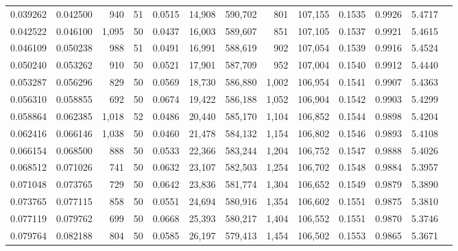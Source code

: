 \begin{tabular}{rrrrrrrrrrrrr}
0.039262 & 0.042500 &   940 &  51 &                                     0.0515 &  14,908 & 590,702 &     801 & 107,155 & 0.1535 & 0.9926 & 5.4717 \\
0.042522 & 0.046100 & 1,095 &  50 &                                     0.0437 &  16,003 & 589,607 &     851 & 107,105 & 0.1537 & 0.9921 & 5.4615 \\
0.046109 & 0.050238 &   988 &  51 &                                     0.0491 &  16,991 & 588,619 &     902 & 107,054 & 0.1539 & 0.9916 & 5.4524 \\
0.050240 & 0.053262 &   910 &  50 &                                     0.0521 &  17,901 & 587,709 &     952 & 107,004 & 0.1540 & 0.9912 & 5.4440 \\
0.053287 & 0.056296 &   829 &  50 &                                     0.0569 &  18,730 & 586,880 &   1,002 & 106,954 & 0.1541 & 0.9907 & 5.4363 \\
0.056310 & 0.058855 &   692 &  50 &                                     0.0674 &  19,422 & 586,188 &   1,052 & 106,904 & 0.1542 & 0.9903 & 5.4299 \\
0.058864 & 0.062385 & 1,018 &  52 &                                     0.0486 &  20,440 & 585,170 &   1,104 & 106,852 & 0.1544 & 0.9898 & 5.4204 \\
0.062416 & 0.066146 & 1,038 &  50 &                                     0.0460 &  21,478 & 584,132 &   1,154 & 106,802 & 0.1546 & 0.9893 & 5.4108 \\
0.066154 & 0.068500 &   888 &  50 &                                     0.0533 &  22,366 & 583,244 &   1,204 & 106,752 & 0.1547 & 0.9888 & 5.4026 \\
0.068512 & 0.071026 &   741 &  50 &                                     0.0632 &  23,107 & 582,503 &   1,254 & 106,702 & 0.1548 & 0.9884 & 5.3957 \\
0.071048 & 0.073765 &   729 &  50 &                                     0.0642 &  23,836 & 581,774 &   1,304 & 106,652 & 0.1549 & 0.9879 & 5.3890 \\
0.073765 & 0.077115 &   858 &  50 &                                     0.0551 &  24,694 & 580,916 &   1,354 & 106,602 & 0.1551 & 0.9875 & 5.3810 \\
0.077119 & 0.079762 &   699 &  50 &                                     0.0668 &  25,393 & 580,217 &   1,404 & 106,552 & 0.1551 & 0.9870 & 5.3746 \\
0.079764 & 0.082188 &   804 &  50 &                                     0.0585 &  26,197 & 579,413 &   1,454 & 106,502 & 0.1553 & 0.9865 & 5.3671 \\

\end{tabular}
